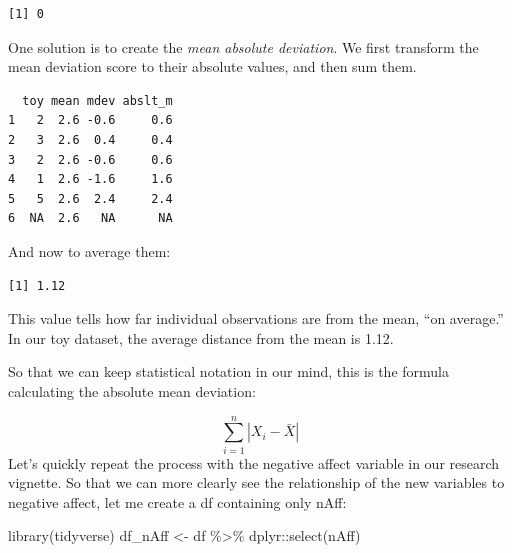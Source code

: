 \documentclass[
  11pt,
]{book}
\newenvironment{Shaded}{\begin{snugshade}}{\end{snugshade}}
\newcommand{\AttributeTok}[1]{\textcolor[rgb]{0.77,0.63,0.00}{#1}}
\newcommand{\ConstantTok}[1]{\textcolor[rgb]{0.00,0.00,0.00}{#1}}
\newcommand{\DecValTok}[1]{\textcolor[rgb]{0.00,0.00,0.81}{#1}}
\newcommand{\FunctionTok}[1]{\textcolor[rgb]{0.00,0.00,0.00}{#1}}
\newcommand{\NormalTok}[1]{#1}
\newcommand{\OtherTok}[1]{\textcolor[rgb]{0.56,0.35,0.01}{#1}}
\newcommand{\SpecialCharTok}[1]{\textcolor[rgb]{0.00,0.00,0.00}{#1}}
\begin{document}
\begin{verbatim}
[1] 0
\end{verbatim}

One solution is to create the \emph{mean absolute deviation}. We first transform the mean deviation score to their absolute values, and then sum them.

\begin{Shaded}
\end{Shaded}

\begin{verbatim}
  toy mean mdev abslt_m
1   2  2.6 -0.6     0.6
2   3  2.6  0.4     0.4
3   2  2.6 -0.6     0.6
4   1  2.6 -1.6     1.6
5   5  2.6  2.4     2.4
6  NA  2.6   NA      NA
\end{verbatim}

And now to average them:

\begin{Shaded}
\end{Shaded}

\begin{verbatim}
[1] 1.12
\end{verbatim}

This value tells how far individual observations are from the mean, ``on average.'' In our toy dataset, the average distance from the mean is 1.12.

So that we can keep statistical notation in our mind, this is the formula calculating the absolute mean deviation:

\[\sum_{i=1}^{n}|X_{i} - \bar{X}|\]
Let's quickly repeat the process with the negative affect variable in our research vignette. So that we can more clearly see the relationship of the new variables to negative affect, let me create a df containing only nAff:

\begin{Shaded}
\begin{Highlighting}[]
\FunctionTok{library}\NormalTok{(tidyverse)}
\NormalTok{df\_nAff }\OtherTok{\textless{}{-}}\NormalTok{ df }\SpecialCharTok{\%\textgreater{}\%}
\NormalTok{    dplyr}\SpecialCharTok{::}\FunctionTok{select}\NormalTok{(nAff)}
\end{Highlighting}
\end{Shaded}
\end{document}
